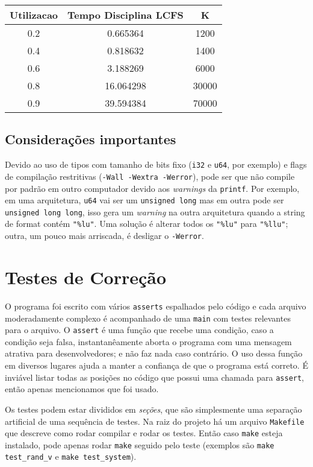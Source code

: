\documentclass[a4paper]{article}
\newcommand{\arq}{\texttt}
\newcommand{\inlcode}{\texttt}
\begin{document}
\begin{center} \begin{tabular}{|c|c|c|}
    \hline
     Utilizacao & Tempo Disciplina LCFS & K\\
    \hline
    0.2 & 0.665364 & 1200 \\
    \hline
    0.4 & 0.818632 & 1400\\
    \hline
    0.6 &  3.188269 & 6000\\
    \hline
    0.8 & 16.064298 & 30000 \\
    \hline
    0.9 & 39.594384 & 70000\\
    \hline
\end{tabular} \end{center}


\subsection{Considerações importantes}

Devido ao uso de tipos com tamanho de bits fixo
(\inlcode{i32} e \inlcode{u64}, por exemplo)
e flags de compilação restritivas (\inlcode{-Wall -Wextra -Werror}),
pode ser que não compile por padrão em outro computador
devido aos \emph{warnings} da \inlcode{printf}.
Por exemplo, em uma arquitetura,
\inlcode{u64} vai ser um \inlcode{unsigned long}
mas em outra pode ser \inlcode{unsigned long long},
isso gera um \emph{warning} na outra arquitetura
quando a string de format contém \verb."%lu"..
Uma solução é alterar todos os
\verb."%lu". para \verb."%llu".;
outra, um pouco mais arriscada,
é desligar o \inlcode{-Werror}.

\newpage
\section{Testes de Correção}
O programa foi escrito com vários \inlcode{asserts}
espalhados pelo código
e cada arquivo moderadamente complexo é acompanhado
de uma \inlcode{main} com testes relevantes para o arquivo.
O \inlcode{assert} é uma função que recebe uma condição,
caso a condição seja falsa,
instantanêamente aborta o programa com uma mensagem
atrativa para desenvolvedores;
e não faz nada caso contrário.
O uso dessa função em diversos lugares ajuda a
manter a confiança de que o programa está correto.
É inviável listar todas as posições no código
que possui uma chamada para \inlcode{assert},
então apenas mencionamos que foi usado.

Os testes podem estar divididos em \emph{seções},
que são simplesmente uma separação artificial
de uma sequência de testes.
Na raiz do projeto há um arquivo \arq{Makefile} que descreve
como rodar compilar e rodar os testes.
Então caso \inlcode{make} esteja instalado,
pode apenas rodar \inlcode{make} seguido pelo teste
(exemplos são \inlcode{make test\_rand\_v}
e \inlcode{make test\_system}).
\end{document}
